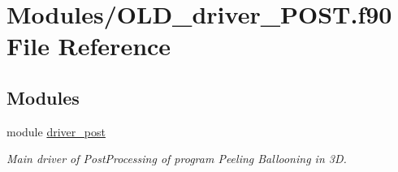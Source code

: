 \hypertarget{OLD__driver__POST_8f90}{}\section{Modules/\+O\+L\+D\+\_\+driver\+\_\+\+P\+O\+ST.f90 File Reference}
\label{OLD__driver__POST_8f90}
\subsection*{Modules}
\begin{DoxyCompactItemize}
\item 
module \hyperlink{namespacedriver__post}{driver\+\_\+post}
\begin{DoxyCompactList}\small\item\em Main driver of Post\+Processing of program Peeling Ballooning in 3D. \end{DoxyCompactList}\end{DoxyCompactItemize}
